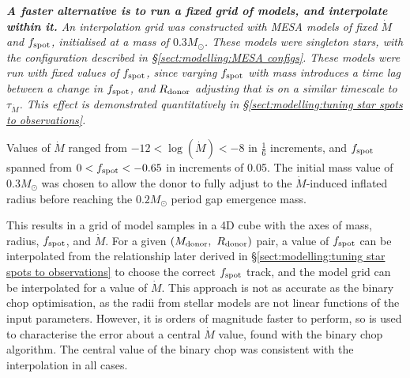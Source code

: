 {\it{\bf A faster alternative is to run a fixed grid of models, and interpolate within it.}
An interpolation grid was constructed with MESA models of fixed $\dot M$ and $f_{\rm spot}$, initialised at a mass of $0.3 M_\odot$. These models were singleton stars, with the configuration described in \S\ref{sect:modelling:MESA configs}. These models were run with fixed values of $f_{\rm spot}$, since varying $f_{\rm spot}$ with mass introduces a time lag between a change in $f_{\rm spot}$, and $R_{\rm donor}$ adjusting that is on a similar timescale to $\tau_{\dot M}$. This effect is demonstrated quantitatively in \S\ref{sect:modelling:tuning star spots to observations}.

Values of $\dot M$ ranged from $-12<\log(\dot M)<-8$ in $\frac{1}{6}$ increments, and $f_{\rm spot}$ spanned from $0<f_{\rm spot}<-0.65$ in increments of 0.05. The initial mass value of $0.3 M_\odot$ was chosen to allow the donor to fully adjust to the $\dot M$-induced inflated radius before reaching the $0.2 M_\odot$ period gap emergence mass.

This results in a grid of model samples in a 4D cube with the axes of mass, radius, $f_{\rm spot}$, and $\dot M$.
For a given $(M_{\rm donor},\ R_{\rm donor})$ pair, a value of $f_{\rm spot}$ can be interpolated from the relationship later derived in \S\ref{sect:modelling:tuning star spots to observations} to choose the correct $f_{\rm spot}$ track, and the model grid can be interpolated for a value of $\dot M$.
This approach is not as accurate as the binary chop optimisation, as the radii from stellar models are not linear functions of the input parameters. However, it is orders of magnitude faster to perform, so is used to characterise the error about a central $\dot M$ value, found with the binary chop algorithm.
The central value of the binary chop was consistent with the interpolation in all cases.
}

